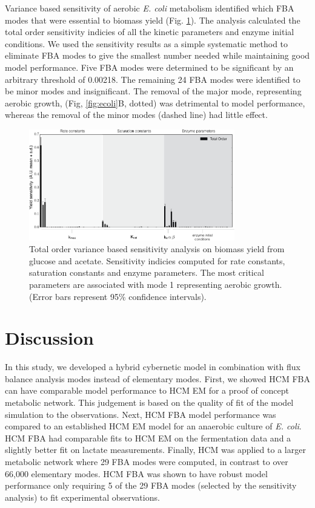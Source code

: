 \documentclass[10pt,twocolumn,twoside,final]{IEEEtran}
\begin{document}
Variance based sensitivity of aerobic \textit{E. coli} metabolism identified which FBA modes that were essential to biomass yield (Fig. \ref{fig:sensitivity}).
The analysis calculated the total order sensitivity indicies of all the kinetic parameters and enzyme initial conditions.
We used the sensitivity results as a simple systematic method to eliminate FBA modes to give the smallest number needed while maintaining good model performance.
Five FBA modes were determined to be significant by an arbitrary threshold of 0.00218.
The remaining 24 FBA modes were identified to be minor modes and insignificant.
The removal of the major mode, representing aerobic growth, (Fig, \ref{fig:ecoli}B, dotted)
was detrimental to model performance, whereas the removal of the minor modes (dashed line) had little effect.

\begin{figure}[!t]\centering
\includegraphics[width=0.80\textwidth]{./figs/Fig-3-Sensitivity-Results.pdf}
\caption{Total order variance based sensitivity analysis on biomass yield from glucose and acetate. Sensitivity indicies computed for rate constants, saturation constants and enzyme parameters. The most critical parameters are associated with mode 1 representing aerobic growth. (Error bars represent 95\% confidence intervals).
}
\label{fig:sensitivity}
\end{figure}


\section{Discussion}
In this study, we developed a hybrid cybernetic model in combination with flux balance analysis modes instead of elementary modes.
First, we showed HCM FBA can have comparable model performance to HCM EM for a proof of concept metabolic network.
This judgement is based on the quality of fit of the model simulation to the observations.
Next, HCM FBA model performance was compared to an established HCM EM model\cite{2008_kim_varner_ramkrishna_BiotechProg} for an anaerobic culture of \textit{E. coli}.
HCM FBA had comparable fits to HCM EM on the fermentation data and a slightly better fit on lactate measurements.
Finally, HCM was applied to a larger metabolic network where 29 FBA modes were computed, in contrast to over 66,000 elementary modes.
HCM FBA was shown to have robust model performance only requiring 5 of the 29 FBA modes (selected by the sensitivity analysis) to fit experimental observations.
\end{document}
